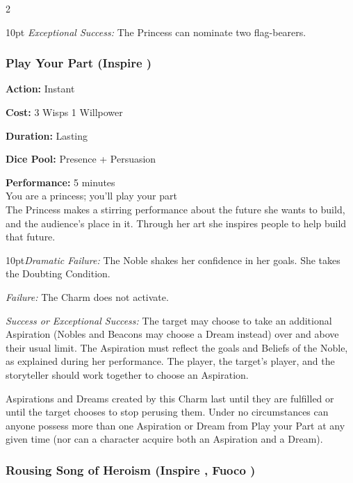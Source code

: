 \begin{multicols}{2}
\begin{myindentpar}{10pt}
    \emph{Exceptional Success:} The Princess can nominate two flag-bearers. 
	
	\end{myindentpar}


\subsubsection*{Play Your Part (Inspire \textbullet\textbullet\textbullet)}

\noindent \textbf{Action:} Instant

\noindent \textbf{Cost:} 3 Wisps 1 Willpower

\noindent \textbf{Duration:} Lasting 

\noindent \textbf{Dice Pool:} Presence + Persuasion 

\noindent \textbf{Performance:} 5 minutes \\

\noindent You are a princess; you'll play your part\\

The Princess makes a stirring performance about the future she wants to build, and the audience's place in it. Through her art she inspires people to help build that future. 

   \begin{myindentpar}{10pt}\emph{Dramatic Failure:} The Noble shakes her confidence in her goals. She takes the Doubting Condition.

    \emph{Failure:} The Charm does not activate.

    \emph{Success or Exceptional Success:} The target may choose to take an additional Aspiration (Nobles and Beacons may choose a Dream instead) over and above their usual limit.  The Aspiration must reflect the goals and Beliefs of the Noble, as explained during her performance. The player, the target's player, and the storyteller should work together to choose an Aspiration. 
    
    Aspirations and Dreams created by this Charm last until they are fulfilled or until the target chooses to stop perusing them. Under no circumstances can anyone possess more than one Aspiration or Dream from Play your Part at any given time (nor can a character acquire both an Aspiration and a Dream).   

	\end{myindentpar}
	
\subsubsection*{Rousing Song of Heroism (Inspire \textbullet\textbullet\textbullet, Fuoco \textbullet\textbullet)}


\end{multicols}
